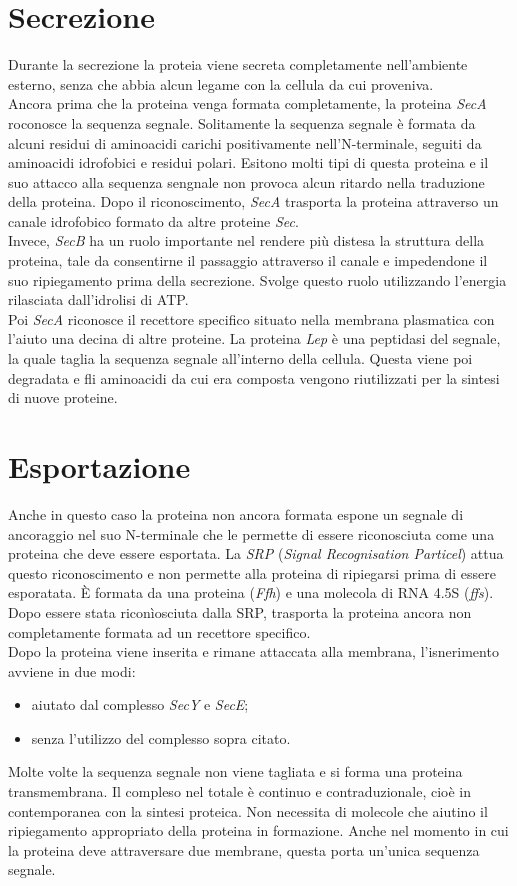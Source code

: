 \section{Secrezione}
Durante la secrezione la proteia viene secreta completamente nell'ambiente esterno, senza che abbia alcun legame con la cellula da cui proveniva. 
\\Ancora prima che la proteina venga formata completamente, la proteina \textit{SecA} roconosce la sequenza segnale. Solitamente la sequenza segnale \`e formata da alcuni residui di aminoacidi carichi positivamente nell'N-terminale, seguiti da aminoacidi idrofobici e residui polari. Esitono molti tipi di questa proteina e il suo attacco alla sequenza sengnale non provoca alcun ritardo nella traduzione della proteina. Dopo il riconoscimento, \textit{SecA} trasporta la proteina attraverso un canale idrofobico formato da altre proteine \textit{Sec}.
\\Invece, \textit{SecB} ha un ruolo importante nel rendere pi\`u distesa la struttura della proteina, tale da consentirne il passaggio attraverso il canale e impedendone il suo ripiegamento prima della secrezione. Svolge questo ruolo utilizzando l'energia rilasciata dall'idrolisi di ATP.
\\Poi \textit{SecA} riconosce il recettore specifico situato nella membrana plasmatica con l'aiuto una decina di altre proteine. La proteina \textit{Lep} \`e una peptidasi del segnale, la quale taglia la sequenza segnale all'interno della cellula. Questa viene poi degradata e fli aminoacidi da cui era composta vengono riutilizzati per la sintesi di nuove proteine.
\section{Esportazione}
Anche in questo caso la proteina non ancora formata espone un segnale di ancoraggio nel suo N-terminale che le permette di essere riconosciuta come una proteina che deve essere esportata. 
La \textit{SRP} (\textit{Signal Recognisation Particel}) attua questo riconoscimento e non permette alla proteina di ripiegarsi prima di essere esporatata. \`E formata da una proteina (\textit{Ffh}) e una molecola di RNA 4.5S (\textit{ffs}). Dopo essere stata riconìosciuta dalla SRP, trasporta la proteina ancora non completamente formata ad un recettore specifico. 
\\Dopo la proteina viene inserita e rimane attaccata alla membrana, l'isnerimento avviene in due modi:
\begin{itemize}
    \item aiutato dal complesso \textit{SecY} e \textit{SecE}; 
    \item senza l'utilizzo del complesso sopra citato.
\end{itemize}
Molte volte la sequenza segnale non viene tagliata e si forma una proteina transmembrana. Il compleso nel totale \`e continuo e contraduzionale, cio\`e in contemporanea con la sintesi proteica. Non necessita di molecole che aiutino il ripiegamento appropriato  della proteina in formazione. Anche nel momento in cui la proteina deve attraversare due membrane, questa porta un'unica sequenza segnale. 
